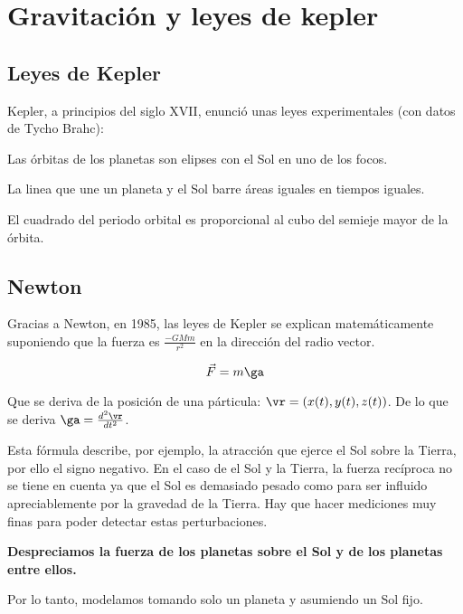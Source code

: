 \chapter{Gravitación y leyes de kepler}
\section{Leyes de Kepler}

Kepler, a principios del siglo XVII, enunció unas leyes experimentales (con datos de Tycho Brahc):

\begin{lemma}
	Las órbitas de los planetas son elipses con el Sol en uno de los focos.
\end{lemma}

\begin{lemma}
	La linea que une un planeta y el Sol barre áreas iguales en tiempos iguales.
\end{lemma}

\begin{lemma}
	El cuadrado del periodo orbital es proporcional al cubo del semieje mayor de la órbita.
\end{lemma}

\section{Newton}

Gracias a Newton, en 1985, las leyes de Kepler se explican matemáticamente suponiendo que la fuerza es $ \frac{-GMm}{r^2} $ en la dirección del radio vector.



$$ \vec{F} = m\ga$$

Que se deriva de la posición de una párticula: $\vr = (x(t), y(t), z(t))$. De lo que se deriva $ \ga = \frac{d^2\vr}{d t^2} $.

Esta fórmula describe, por ejemplo, la atracción que ejerce el Sol sobre la Tierra, por ello el signo negativo. En el caso de el Sol y la Tierra, la fuerza recíproca no se tiene en cuenta ya que el Sol es demasiado pesado como para ser influido apreciablemente por la gravedad de la Tierra. Hay que hacer mediciones muy finas para poder detectar estas perturbaciones.

\textbf{Despreciamos la fuerza de los planetas sobre el Sol y de los planetas entre ellos.}

Por lo tanto, modelamos tomando solo un planeta y asumiendo un Sol fijo.


